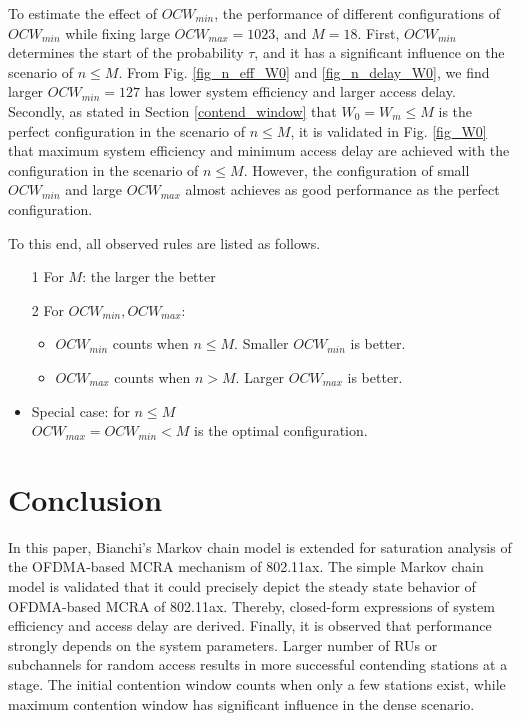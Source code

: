 \documentclass[journal]{IEEEtran}
\begin{document}
To estimate the effect of $OCW_{min}$, the performance of different configurations of $OCW_{min}$ while fixing large $OCW_{max}=1023$, and $M=18$. 
First, $OCW_{min}$ determines the start of the probability $\tau$, and it has a significant influence on the scenario of $n\leq M$.
From Fig. \ref{fig_n_eff_W0} and \ref{fig_n_delay_W0}, we find larger $OCW_{min}=127$ has lower system efficiency and larger access delay. 
Secondly, as stated in Section \ref{contend_window} that $W_0=W_m\leq M$ is the perfect configuration in the scenario of $n\leq M$, it is validated in Fig. \ref{fig_W0} that maximum system efficiency and minimum access delay are achieved with the configuration in the scenario of $n\leq M$.
However, the configuration of small $OCW_{min}$ and large $OCW_{max}$ almost achieves as good performance as the perfect configuration.  

To this end, all observed rules are listed as follows.
 
\begin{itemize}
\item[1] For $M$: the larger the better
\item[2] For $OCW_{min}, OCW_{max}$:
	\begin{itemize}
	\item $OCW_{min}$ counts when $n\leq M$. Smaller $OCW_{min}$ is better.
	\item $OCW_{max}$ counts when $n>M$. Larger $OCW_{max}$ is better.
	\end{itemize}
\end{itemize}
\begin{itemize}
	\item Special case: for $n\leq M$\\
	$OCW_{max}=OCW_{min}<M$ is the optimal configuration.  
\end{itemize}





\section{Conclusion}   \label{sec_conclu}
In this paper, Bianchi's Markov chain model is extended for saturation analysis of the OFDMA-based MCRA mechanism of 802.11ax.
The simple Markov chain model is validated that it could precisely depict the steady state behavior of OFDMA-based MCRA of 802.11ax.
Thereby, closed-form expressions of system efficiency and access delay are derived. 
Finally, it is observed that performance strongly depends on the system parameters. 
Larger number of RUs or subchannels for random access results in more successful contending stations at a stage.
The initial contention window counts when only a few stations exist, while maximum contention window has significant influence in the dense scenario.
\end{document}
